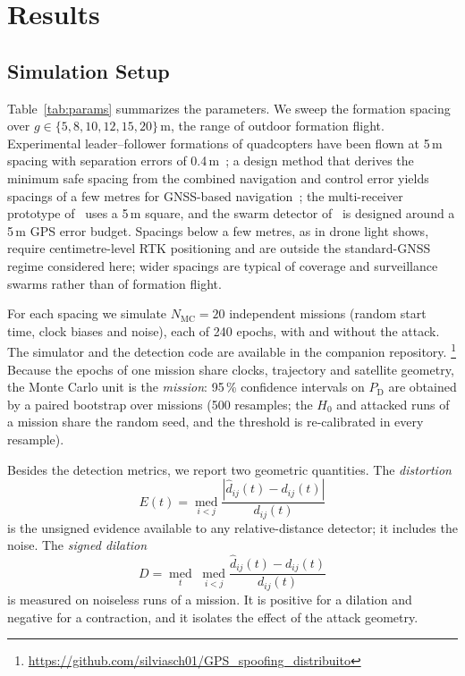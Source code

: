 \documentclass[conference]{IEEEtran}
\newcommand{\PD}{P_{\mathrm{D}}}
\begin{document}
\section{Results}
\label{sec:results}

\subsection{Simulation Setup}
\label{sec:setup}
Table~\ref{tab:params} summarizes the parameters. We sweep the formation
spacing over $g\in\{5,8,10,12,15,20\}$\,m, the range of outdoor
formation flight. Experimental leader--follower formations of
quadcopters have been flown at 5\,m spacing with separation errors of
0.4\,m~\cite{cheok2022formation}; a design method that derives the
minimum safe spacing from the combined navigation and control error
yields spacings of a few metres for GNSS-based
navigation~\cite{guo2025separation}; the multi-receiver prototype
of~\cite{jansen2016multireceiver} uses a 5\,m square, and the swarm
detector of~\cite{mykytyn2023uwb} is designed around a 5\,m GPS error
budget. Spacings below a few metres, as in drone light shows, require
centimetre-level RTK positioning and are outside the standard-GNSS
regime considered here; wider spacings are typical of coverage and
surveillance swarms rather than of formation flight.

For each spacing we simulate $N_{\mathrm{MC}}=20$ independent missions
(random start time, clock biases and noise), each of 240 epochs, with
and without the attack. The simulator and the detection code are
available in the companion repository.%
\footnote{\url{https://github.com/silviasch01/GPS_spoofing_distribuito}}
Because the epochs of one mission share clocks, trajectory and satellite
geometry, the Monte Carlo unit is the \emph{mission}: 95\,\% confidence
intervals on $\PD$ are obtained by a paired bootstrap over missions (500
resamples; the $H_0$ and attacked runs of a mission share the random
seed, and the threshold is re-calibrated in every resample).

Besides the detection metrics, we report two geometric quantities. The
\emph{distortion}
\begin{equation}
E(t)=\operatorname*{med}_{i<j}\frac{|\hat{d}_{ij}(t)-d_{ij}(t)|}{d_{ij}(t)}
\label{eq:E}
\end{equation}
is the unsigned evidence available to any relative-distance detector; it
includes the noise. The \emph{signed dilation}
\begin{equation}
D=\operatorname*{med}_{t}\;\operatorname*{med}_{i<j}\frac{\hat{d}_{ij}(t)-d_{ij}(t)}{d_{ij}(t)}
\label{eq:D}
\end{equation}
is measured on noiseless runs of a mission. It is positive for a
dilation and negative for a contraction, and it isolates the effect of
the attack geometry.
\end{document}
